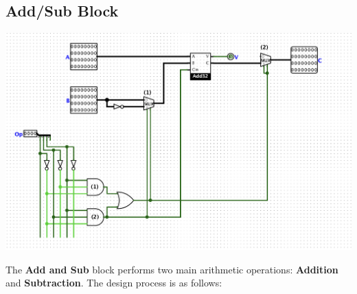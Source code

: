 \documentclass{article}
\begin{document}
\subsection{Add/Sub Block}
\begin{center}
    \includegraphics[width=1\textwidth]{images/AddSub32.png}
\end{center}
\hspace{2em} The \textbf{Add and Sub} block performs two main arithmetic operations: \textbf{Addition} and \textbf{Subtraction}. The design process is as follows:
\end{document}
